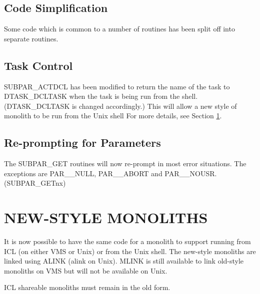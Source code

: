 \subsection{Code Simplification}
Some code which is common to a number of routines has been split off into
separate routines.

\subsection{Task Control}
SUBPAR\_ACTDCL has been modified to return the name of the task to
DTASK\_DCLTASK when the task is being run from the shell. 
(DTASK\_DCLTASK is changed accordingly.)
This will allow a new style of monolith to be run from the Unix shell
For more details, see Section \ref{monoliths}.

\subsection{Re-prompting for Parameters}
The SUBPAR\_GET routines will now re-prompt in most error situations. The
exceptions are PAR\_\_NULL, PAR\_\_ABORT and PAR\_\_NOUSR.\\
(SUBPAR\_GETnx)


\section{NEW-STYLE MONOLITHS}
\label{monoliths}
It is now possible to have the same code for a monolith to support running
from ICL (on either VMS or Unix) or from the Unix shell.
The new-style monoliths are linked using ALINK (alink on Unix). MLINK is still
available to link old-style monoliths on VMS but will not be available on Unix.

ICL shareable monoliths must remain in the old form.

